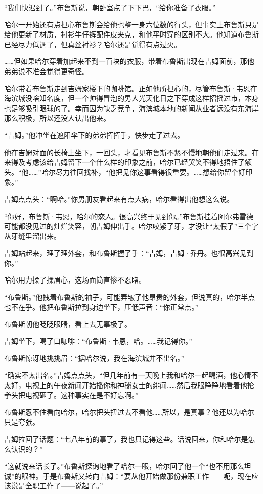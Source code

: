 \documentclass[../main]{subfiles}
\begin{document}
“我们快迟到了。”布鲁斯说，朝卧室点了下下巴，“给你准备了衣服。”

哈尔一开始还有点担心布鲁斯会给他也整一身六位数的行头，但事实上布鲁斯只是给他更新了材质，衬衫牛仔裤配件皮夹克，和他平时穿的区别不大。他知道布鲁斯已经尽力低调了，但真丝衬衫？哈尔还是觉得有点过火。

……但如果哈尔穿着加起来不到一百块的衣服，带着布鲁斯出现在吉姆面前，那他弟弟说不准会觉得更奇怪。

哈尔带着布鲁斯走到吉姆家楼下的咖啡馆。正如他所担心的，尽管布鲁斯·韦恩在海滨城没啥知名度，但一个帅得冒泡的男人光天化日之下穿成这样招摇过市，本身也足够吸引眼球的了。幸而因为缺乏竞争，海滨城本地的新闻从业者远没有东海岸那么积极，所以还没人认出他来。

“吉姆。”他冲坐在遮阳伞下的弟弟挥挥手，快步走了过去。

他在吉姆对面的长椅上坐下，一回头，才看见布鲁斯不紧不慢地朝他们走过来。在来得及考虑该给吉姆留下一个什么样的印象之前，哈尔已经哭笑不得地捂住了额头。“他\ldots\ldots”哈尔尽力往回找补，“他把见你这事看得很重要。……想给你留个好印象。”

吉姆点点头：“啊哈。”你男朋友看起来有点大病，哈尔看得出他想这么说。

“你好，布鲁斯·韦恩，哈尔的恋人。很高兴终于见到你。”布鲁斯挂着阿尔弗雷德可能都没见过的灿烂笑容，朝吉姆伸出手。哈尔咬紧了牙，才没让“太假了”三个字从牙缝里溜出来。

吉姆站起来，理了理外套，和布鲁斯握了手：“吉姆，吉姆·乔丹。也很高兴见到你。”

哈尔用力揉了揉眉心，这场面简直惨不忍睹。

“布鲁斯。”他拽着布鲁斯的袖子，可能弄皱了他昂贵的外套，但说真的，哈尔半点也不在乎。他把布鲁斯拉到身边坐下，压低声音：“你正常点。”

布鲁斯朝他眨眨眼睛，看上去无辜极了。

吉姆坐下，喝了口咖啡：“布鲁斯·韦恩，哈。……我记得你。”

布鲁斯惊讶地挑挑眉：“据哈尔说，我在海滨城并不出名。”

“确实不太出名。”吉姆点点头，“但几年前有一天晚上我和哈尔一起喝酒，他心情不太好，电视上的午夜新闻开始播你和神秘女士的绯闻……然后我眼睁睁地看着他抡拳头把电视砸了。这种事实在是不好忘啊。”

布鲁斯忍不住看向哈尔，哈尔把头扭过去不看他……所以，是真事？他还以为哈尔只是夸张。

吉姆拉回了话题：“七八年前的事了，我也只记得这些。话说回来，你和哈尔是怎么认识的？”

“这就说来话长了。”布鲁斯探询地看了哈尔一眼，哈尔回了他一个“也不用那么坦诚”的眼神。于是布鲁斯又转向吉姆：“要从他开始做那份兼职工作——呃，现在应该说是全职工作了——说起了。”
\end{document}
